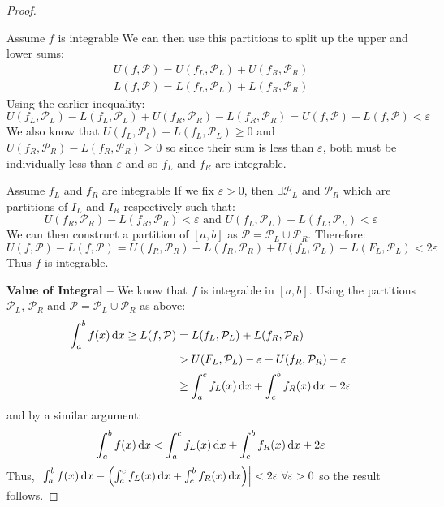 \documentclass[../main.tex]{subfiles}
\begin{document}
\begin{proof}
\begin{proofdirection}{Assume $f$ is integrable}
    We can then use this partitions to split up the upper and lower sums:
    \begin{align*}
      U(f, \mathcal{P}) = U(f_L, \mathcal{P}_L) + U(f_R, \mathcal{P}_R) \\
      L(f, \mathcal{P}) = L(f_L, \mathcal{P}_L) + L(f_R, \mathcal{P}_R)
    \end{align*}
    Using the earlier inequality:
    \[
      U(f_L, \mathcal{P}_L) - L(f_L, \mathcal{P}_L) + U(f_R, \mathcal{P}_R) - L(f_R, \mathcal{P}_R) = U(f, \mathcal{P}) - L(f, \mathcal{P}) < \varepsilon
    \]
    We also know that $U(f_L, \mathcal{P}_l) - L(f_L, \mathcal{P}_L) \geq 0$ and $U(f_R, \mathcal{P}_R) - L(f_R, \mathcal{P}_R) \geq 0$ so since their sum is less than $\varepsilon$, both must be individually less than $\varepsilon$ and so $f_L$ and $f_R$ are integrable.
  \end{proofdirection}
  \begin{proofdirection}{Assume $f_L$ and $f_R$ are integrable}
    If we fix $\varepsilon > 0$, then $\exists \mathcal{P}_L$ and $\mathcal{P}_R$ which are partitions of $I_L$ and $I_R$ respectively such that:
    \[
      U(f_R, \mathcal{P}_R) - L(f_R, \mathcal{P}_R) < \varepsilon \text{ and } U(f_L, \mathcal{P}_L) - L(f_L, \mathcal{P}_L) < \varepsilon
    \]
    We can then construct a partition of $[a, b]$ as $\mathcal{P} = \mathcal{P}_L \cup \mathcal{P}_R$.
    Therefore:
    \[
      U(f, \mathcal{P}) - L(f, \mathcal{P}) = U(f_R, \mathcal{P}_R) - L(f_R, \mathcal{P}_R) + U(f_L, \mathcal{P}_L) - L(F_L, \mathcal{P}_L) < 2\varepsilon
    \]
    Thus $f$ is integrable.
  \end{proofdirection}\par
  \textbf{Value of Integral --} We know that $f$ is integrable in $[a, b]$.
  Using the partitions $\mathcal{P}_L$, $\mathcal{P}_R$  and $\mathcal{P} = \mathcal{P}_L \cup \mathcal{P}_R$ as above:
  \begin{align*}
    \int_{a}^{b} f(x) \d{x} \geq L(f, \mathcal{P}) &= L(f_L, \mathcal{P}_L) + L(f_R, \mathcal{P}_R) \\
                            &> U(F_L, \mathcal{P}_L) - \varepsilon + U(f_R, \mathcal{P}_R) - \varepsilon \\
                            &\geq \int_{a}^{c} f_L(x) \d{x} + \int_{c}^{b} f_R(x) \d{x} - 2\varepsilon
  \end{align*}
  and by a similar argument:
  \[
    \int_{a}^{b} f(x) \d{x} < \int_{a}^{c} f_L(x) \d{x} + \int_{c}^{b} f_R(x) \d{x} + 2\varepsilon
  \]
  Thus, $\abs{\int_{a}^{b} f(x) \d{x} - \left(\int_{a}^{c} f_L(x) \d{x} + \int_{c}^{b} f_R(x) \d{x}\right)} < 2\varepsilon\ \forall \varepsilon > 0$ so the result follows.
\end{proof}
\end{document}
